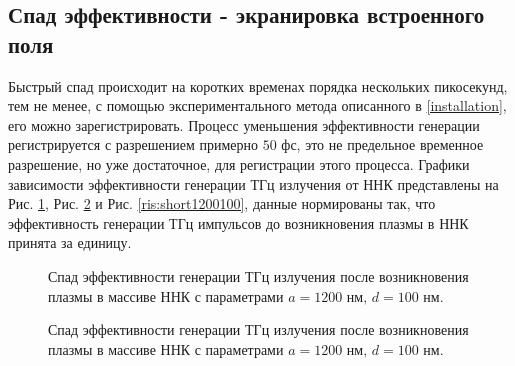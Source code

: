 \documentclass[a4paper,14pt,russian]{extreport}
\begin{document}
			\subsection{Спад эффективности - экранировка встроенного поля}
				Быстрый спад происходит на коротких временах порядка нескольких пикосекунд, тем не менее, с помощью экспериментального метода описанного в \ref{installation}, его можно зарегистрировать. Процесс уменьшения эффективности генерации регистрируется с разрешением примерно $50 \text{ фс}$, это не предельное временное разрешение, но уже достаточное, для регистрации этого процесса. Графики зависимости эффективности генерации ТГц излучения от ННК представлены на Рис. \ref{ris:short600100}, Рис. \ref{ris:short120065} и Рис. \ref{ris:short1200100}, данные нормированы так, что эффективность генерации ТГц импульсов до возникновения плазмы в ННК принята за единицу.\par
				\begin{figure}[h!]
					\caption{Спад эффективности генерации ТГц излучения после возникновения плазмы в массиве ННК с параметрами $a = 1200 \text{ нм, } d = 100 \text{ нм}$.}
				\label{ris:short600100}
				\end{figure}
				\begin{figure}[h!]
					\caption{Спад эффективности генерации ТГц излучения после возникновения плазмы в массиве ННК с параметрами $a = 1200 \text{ нм, } d = 100 \text{ нм}$.}
				\label{ris:short120065}
				\end{figure}
\end{document}
